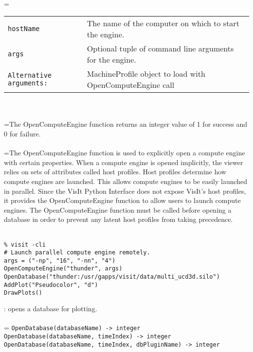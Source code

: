 \documentclass[10pt,a4paper]{report}
\begin{document}
 \\ 
\hangindent=\parindent 
\begin{tabular}{lp{9cm}}
\verb!hostName! & The name of the computer on which to start the engine. \\
\verb!args! & Optional tuple of command line arguments for the engine. \\
\verb!Alternative arguments:! & MachineProfile object to load with OpenComputeEngine call \\
\end{tabular} \\[-2mm]


 \\ 
\hangindent=\parindent The OpenComputeEngine function returns an integer value of 1 for success and 0 for failure. \\[-3mm] 

 \\ 
\hangindent=\parindent The OpenComputeEngine function is used to explicitly open a compute engine with certain properties. When a compute engine is opened implicitly, the viewer relies on sets of attributes called host profiles. Host profiles determine how compute engines are launched. This allows compute engines to be easily launched in parallel. Since the VisIt Python Interface does not expose VisIt's host profiles, it provides the OpenComputeEngine function to allow users to launch compute engines. The OpenComputeEngine function must be called before opening a database in order to prevent any latent host profiles from taking precedence. \\[-3mm] 

\\[-6mm]
\begin{verbatim}% visit -cli
# Launch parallel compute engine remotely.
args = ("-np", "16", "-nn", "4")
OpenComputeEngine("thunder", args)
OpenDatabase("thunder:/usr/gapps/visit/data/multi_ucd3d.silo")
AddPlot("Pseudocolor", "d")
DrawPlots()
\end{verbatim}
\newpage


{}
: opens a database for plotting.\\[-3mm]

 \\ 
\hangindent=\parindent 
\verb!OpenDatabase(databaseName) -> integer!\\ 
\verb!OpenDatabase(databaseName, timeIndex) -> integer!\\ 
\verb!OpenDatabase(databaseName, timeIndex, dbPluginName) -> integer!\\ [-3mm]
\end{document}
